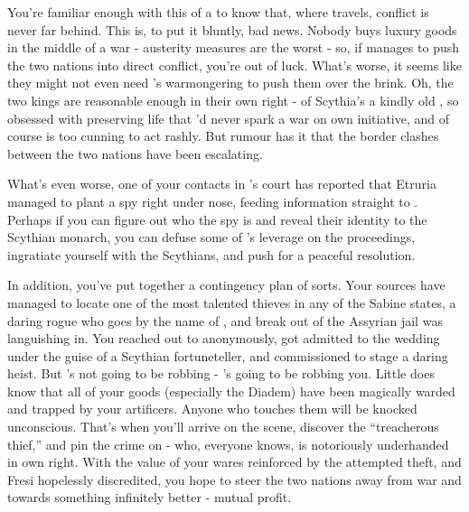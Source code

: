 \documentclass[char]{Kos}
\begin{document}
You're familiar enough with this \cArmsDealer{\InsultTwo} of a \cArmsDealer{\human} to know that, where \cArmsDealer{\they} travels, conflict is never far behind. This is, to put it bluntly, bad news. Nobody buys luxury goods in the middle of a war - austerity measures are the worst - so, if \cArmsDealer{} manages to push the two nations into direct conflict, you're out of luck. What's worse, it seems like they might not even need \cArmsDealer{}'s warmongering to push them over the brink. Oh, the two kings are reasonable enough in their own right - \cScythiaKing{} of Scythia's a kindly old \cScythiaKing{\human}, so obsessed with preserving life that \cScythiaKing{\they}'d never spark a war on \cScythiaKing{\their} own initiative, and \cEtruriaKing{} of course is too cunning to act rashly. But rumour has it that the border clashes between the two nations have been escalating. 

What's even worse, one of your contacts in \cScythiaKing{\Monarch} \cScythiaKing{}'s court has reported that Etruria managed to plant a spy right under \cScythiaKing{\their} nose, feeding information straight to \cEtruriaKing{}. Perhaps if you can figure out who the spy is and reveal their identity to the Scythian monarch, you can defuse some of \cEtruriaKing{}'s leverage on the proceedings, ingratiate yourself with the Scythians, and push for a peaceful resolution.

In addition, you've put together a contingency plan of sorts. Your sources have managed to locate one of the most talented thieves in any of the Sabine states, a daring rogue who goes by the name of \cBurglar{}, and break \cBurglar{\them} out of the Assyrian jail \cBurglar{\they} was languishing in. You reached out to \cBurglar{\them} anonymously, got \cBurglar{\them} admitted to the wedding under the guise of a Scythian fortuneteller, and commissioned \cBurglar{\them} to stage a daring heist. But \cBurglar{\they}'s not going to be robbing \cArmsDealer{} - \cBurglar{\they}'s going to be robbing you. Little does \cBurglar{\they} know that all of your goods (especially the Diadem) have been magically warded and trapped by your artificers. Anyone who touches them will be knocked unconscious. That's when you'll arrive on the scene, discover the ``treacherous thief,'' and pin the crime on \cArmsDealer{} - who, everyone knows, is notoriously underhanded in \cArmsDealer{\their} own right. With the value of your wares reinforced by the attempted theft, and Fresi hopelessly discredited, you hope to steer the two nations away from war and towards something infinitely better - mutual profit.
\end{document}

